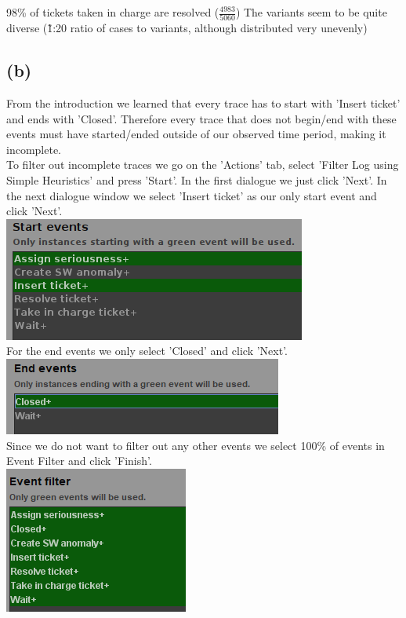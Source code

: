 \documentclass[../../main.tex]{subfiles}
\begin{document}
98\% of tickets taken in charge are resolved ($\frac{4983}{5060}$)
The variants seem to be quite diverse (\~1:20 ratio of cases to variants, although distributed very unevenly)


\subsection*{(b)}
From the introduction we learned that every trace has to start with 'Insert ticket' and ends with 'Closed'. Therefore every trace that does not begin/end with these events must have started/ended outside of our observed time period, making it incomplete.\\
To filter out incomplete traces we go on the 'Actions' tab, select 'Filter Log using Simple Heuristics' and press 'Start'. In the first dialogue we just click 'Next'. In the next dialogue window we select 'Insert ticket' as our only start event and click 'Next'. \\
\includegraphics[width=0.5\columnwidth]{img/ProM_b_filter_traces_start.png}\\
For the end events we only select 'Closed' and click 'Next'. \\
\includegraphics[width=0.5\columnwidth]{img/ProM_b_filter_traces_end.png}\\
Since we do not want to filter out any other events we select 100\% of events in Event Filter and click 'Finish'.\\
\includegraphics[width=0.5\columnwidth]{img/ProM_b_filter_traces_events.png}\\
\end{document}
